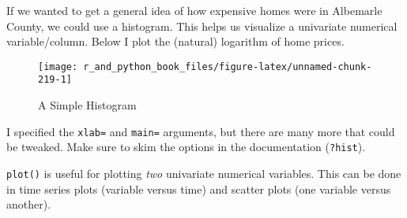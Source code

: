 \documentclass[
  12pt,
  krantz2]{krantz}
\makeatletter
\newenvironment{Shaded}{\begin{snugshade}}{\end{snugshade}}
\newcommand{\AttributeTok}[1]{\textcolor[rgb]{0.61,0.61,0.61}{#1}}
\newcommand{\DecValTok}[1]{\textcolor[rgb]{0.06,0.06,0.06}{#1}}
\newcommand{\FunctionTok}[1]{\textcolor[rgb]{0,0,0}{#1}}
\newcommand{\NormalTok}[1]{#1}
\newcommand{\SpecialCharTok}[1]{\textcolor[rgb]{0,0,0}{#1}}
\newcommand{\StringTok}[1]{\textcolor[rgb]{0.5,0.5,0.5}{#1}}
\newenvironment{kframe}{%
\medskip{}
\setlength{\fboxsep}{.8em}
 \def\at@end@of@kframe{}%
 \ifinner\ifhmode%
  \def\at@end@of@kframe{\end{minipage}}%
  \begin{minipage}{\columnwidth}%
 \fi\fi%
 \def\FrameCommand##1{\hskip\@totalleftmargin \hskip-\fboxsep
 \colorbox{shadecolor}{##1}\hskip-\fboxsep
     \hskip-\linewidth \hskip-\@totalleftmargin \hskip\columnwidth}%
 \MakeFramed {\advance\hsize-\width
   \@totalleftmargin\z@ \linewidth\hsize
   \@setminipage}}%
 {\par\unskip\endMakeFramed%
 \at@end@of@kframe}
\renewenvironment{Shaded}{\begin{kframe}}{\end{kframe}}
\makeatother
\begin{document}
If we wanted to get a general idea of how expensive homes were in Albemarle County, we could use a histogram. This helps us visualize a univariate numerical variable/column. Below I plot the (natural) logarithm of home prices.

\begin{Shaded}
\end{Shaded}

\begin{figure}

{\centering \texttt{[image: r\_and\_python\_book\_files/figure-latex/unnamed-chunk-219-1]} 

}

\caption{A Simple Histogram}\label{fig:unnamed-chunk-219}
\end{figure}

I specified the \texttt{xlab=} and \texttt{main=} arguments, but there are many more that could be tweaked. Make sure to skim the options in the documentation (\texttt{?hist}).

\texttt{plot()} is useful for plotting \emph{two} univariate numerical variables. This can be done in time series plots (variable versus time) and scatter plots (one variable versus another).

\begin{Shaded}
\end{Shaded}
\end{document}
